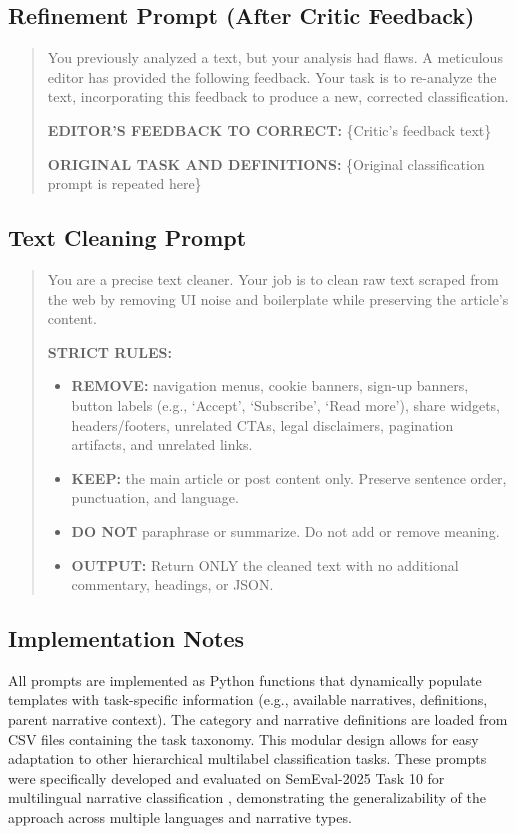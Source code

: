 \subsection{Refinement Prompt (After Critic Feedback)}

\begin{small}
\begin{quote}
You previously analyzed a text, but your analysis had flaws. A meticulous editor has provided the following feedback. Your task is to re-analyze the text, incorporating this feedback to produce a new, corrected classification.

\textbf{EDITOR'S FEEDBACK TO CORRECT:} \{Critic's feedback text\}

\textbf{ORIGINAL TASK AND DEFINITIONS:} \{Original classification prompt is repeated here\}
\end{quote}
\end{small}

\subsection{Text Cleaning Prompt}

\begin{small}
\begin{quote}
You are a precise text cleaner. Your job is to clean raw text scraped from the web by removing UI noise and boilerplate while preserving the article's content.

\textbf{STRICT RULES:}
\begin{itemize}
\item \textbf{REMOVE:} navigation menus, cookie banners, sign-up banners, button labels (e.g., `Accept', `Subscribe', `Read more'), share widgets, headers/footers, unrelated CTAs, legal disclaimers, pagination artifacts, and unrelated links.
\item \textbf{KEEP:} the main article or post content only. Preserve sentence order, punctuation, and language.
\item \textbf{DO NOT} paraphrase or summarize. Do not add or remove meaning.
\item \textbf{OUTPUT:} Return ONLY the cleaned text with no additional commentary, headings, or JSON.
\end{itemize}
\end{quote}
\end{small}

\subsection{Implementation Notes}

All prompts are implemented as Python functions that dynamically populate templates with task-specific information (e.g., available narratives, definitions, parent narrative context). The category and narrative definitions are loaded from CSV files containing the task taxonomy. This modular design allows for easy adaptation to other hierarchical multilabel classification tasks. These prompts were specifically developed and evaluated on SemEval-2025 Task 10 for multilingual narrative classification \citep{semeval2025task10}, demonstrating the generalizability of the approach across multiple languages and narrative types.
